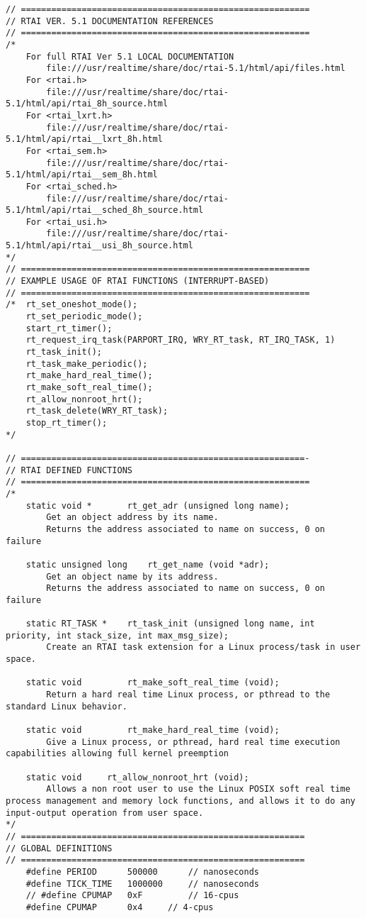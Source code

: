 \begin{lstlisting}[caption={App4-Full C-Code listing for Real Time (RTAI)}, label=App4-Full C-Code listing for Real Time (RTAI)]
// =========================================================
// RTAI VER. 5.1 DOCUMENTATION REFERENCES
// =========================================================
/*
	For full RTAI Ver 5.1 LOCAL DOCUMENTATION
		file:///usr/realtime/share/doc/rtai-5.1/html/api/files.html
	For <rtai.h>
		file:///usr/realtime/share/doc/rtai-5.1/html/api/rtai_8h_source.html
	For <rtai_lxrt.h>
		file:///usr/realtime/share/doc/rtai-5.1/html/api/rtai__lxrt_8h.html
	For <rtai_sem.h>
		file:///usr/realtime/share/doc/rtai-5.1/html/api/rtai__sem_8h.html
	For <rtai_sched.h>
		file:///usr/realtime/share/doc/rtai-5.1/html/api/rtai__sched_8h_source.html
	For <rtai_usi.h>
		file:///usr/realtime/share/doc/rtai-5.1/html/api/rtai__usi_8h_source.html
*/
// =========================================================
// EXAMPLE USAGE OF RTAI FUNCTIONS (INTERRUPT-BASED)
// ========================================================= 
/*	rt_set_oneshot_mode();
	rt_set_periodic_mode();
	start_rt_timer();
	rt_request_irq_task(PARPORT_IRQ, WRY_RT_task, RT_IRQ_TASK, 1)
	rt_task_init(); 
	rt_task_make_periodic(); 
	rt_make_hard_real_time();
	rt_make_soft_real_time();
	rt_allow_nonroot_hrt();
	rt_task_delete(WRY_RT_task);
	stop_rt_timer();
*/

// ========================================================-
// RTAI DEFINED FUNCTIONS
// =========================================================
/*
	static void * 		rt_get_adr (unsigned long name);
		Get an object address by its name. 
		Returns the address associated to name on success, 0 on failure 
	
	static unsigned long 	rt_get_name (void *adr);
		Get an object name by its address. 
		Returns the address associated to name on success, 0 on failure 
	
	static RT_TASK * 	rt_task_init (unsigned long name, int priority, int stack_size, int max_msg_size);
		Create an RTAI task extension for a Linux process/task in user space.
	
	static void 		rt_make_soft_real_time (void);
		Return a hard real time Linux process, or pthread to the standard Linux behavior.
	
	static void 		rt_make_hard_real_time (void);
		Give a Linux process, or pthread, hard real time execution capabilities allowing full kernel preemption
	
	static void 	rt_allow_nonroot_hrt (void);
		Allows a non root user to use the Linux POSIX soft real time process management and memory lock functions, and allows it to do any input-output operation from user space.
*/
// ========================================================
// GLOBAL DEFINITIONS
// ========================================================
	#define PERIOD		500000		// nanoseconds
	#define TICK_TIME	1000000		// nanoseconds
	// #define CPUMAP 	0xF  		// 16-cpus
	#define CPUMAP		0x4		// 4-cpus
	

\end{lstlisting}
